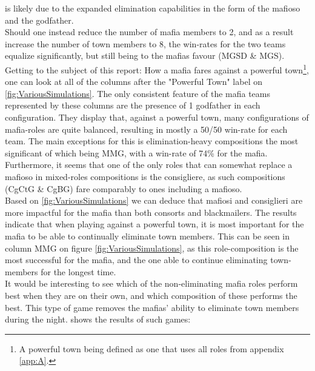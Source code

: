 is likely due to the expanded elimination capabilities in the form of the
mafioso and the godfather. \\ Should one instead reduce the number of mafia
members to 2, and as a result increase the number of town members to 8, the
win-rates for the two teams equalize significantly, but still being to the
mafias favour (MGSD \& MGS).\\ Getting to the subject of this report: How a
mafia fares against a powerful town\footnote{A powerful town being defined as
    one that uses all roles from appendix \ref{app:A}.}, one can look at all of the
columns after the "Powerful Town" label on
\cref{fig:VariousSimulations}. The only consistent feature of the mafia teams
represented by these columns are the presence of 1 godfather in each
configuration. They display that, against a powerful town, many configurations
of mafia-roles are quite balanced, resulting in mostly a 50/50 win-rate for
each team. The main exceptions for this is elimination-heavy compositions the
most significant of which being MMG, with a win-rate of 74\% for the mafia.
Furthermore, it seems that one of the only roles that can somewhat replace a
mafioso in mixed-roles compositions is the consigliere, as such compositions
(CgCtG \& CgBG) fare comparably to ones including a mafioso. \\
Based on \cref{fig:VariousSimulations} we can deduce that mafiosi and
consiglieri are more
impactful for the mafia than both consorts and blackmailers.
The results indicate that when playing
against a powerful town, it is most
important for the mafia to be able to
continually eliminate town members. This can
be seen in column MMG on figure
\ref{fig:VariousSimulations}, as this
role-composition is the most successful for
the mafia, and the one able to continue
eliminating town-members for the longest time.\\
It would be interesting to see which of the non-eliminating mafia roles perform
best when they are on their own, and which composition of these performs the best.
This type of game removes the mafias' ability to eliminate town members during the night.
 shows the results of such games:
